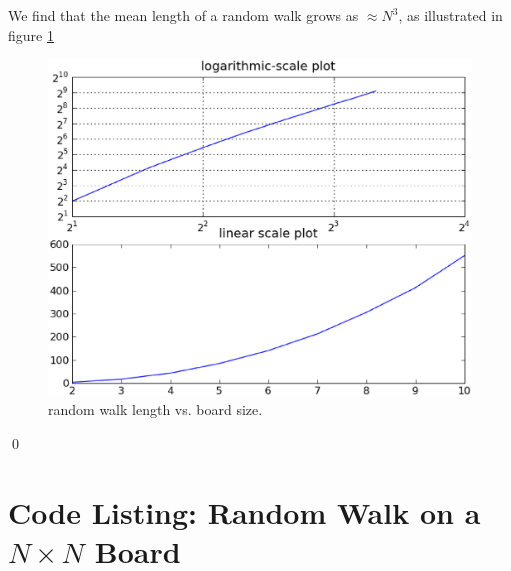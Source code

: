 \documentclass[8pt,notitlepage,twocolumn]{report}
\newenvironment{solution}[1][Solution]{\begin{trivlist}
    \item[\hskip \labelsep {\bfseries #1}]}{\end{trivlist}}
\begin{document}
\begin{solution}
We find that the mean length of a random walk grows as $\approx N^3$, 
as illustrated in figure \ref{hw2q4f2}
\begin{figure}[h]
 \includegraphics[height=.30\textheight]{nboard.eps}
 \caption{random walk length vs. board size.}
   \label{hw2q4f2}
\end{figure}
\qed
\end{solution}
\newpage
\appendix
\section{Code Listing: Random Walk on a $N\times N$ Board}
\label{q4code}
\end{document}
